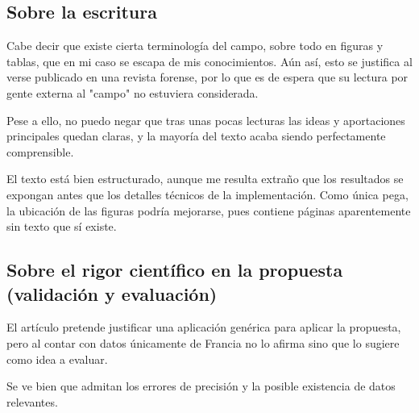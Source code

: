 \documentclass[13pt,a4paper]{article}
\begin{document}

\subsection{Sobre la escritura}

Cabe decir que existe cierta terminología del campo, sobre todo en figuras y tablas, que en mi caso se escapa de mis conocimientos. Aún así, esto se justifica al verse publicado en una revista forense, por lo que es de espera que su lectura por gente externa al "campo" no estuviera considerada.

Pese a ello, no puedo negar que tras unas pocas lecturas las ideas y aportaciones principales quedan claras, y la mayoría del texto acaba siendo perfectamente comprensible.

El texto está bien estructurado, aunque me resulta extraño que los resultados se expongan antes que los detalles técnicos de la implementación. Como única pega, la ubicación de las figuras podría mejorarse, pues contiene páginas aparentemente sin texto que sí existe.


\subsection{Sobre el rigor científico en la propuesta (validación y evaluación)}

El artículo pretende justificar una aplicación genérica para aplicar la propuesta, pero al contar con datos únicamente de Francia no lo afirma sino que lo sugiere como idea a evaluar. 

Se ve bien que admitan los errores de precisión y la posible existencia de datos relevantes.



\end{document}
